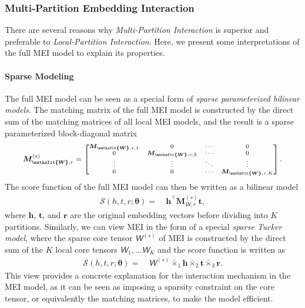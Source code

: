 \documentclass{ecai}
\def\vh{{\bm{h}}}
\def\vr{{\bm{r}}}
\def\vt{{\bm{t}}}
\def\mM{{\bm{M}}}
\newcommand{\tens}[1]{\bm{\mathsfit{#1}}}
\def\tW{{\tens{W}}}
\def\gS{{\mathcal{S}}}
\theoremstyle{plain}  \newtheorem{thm}{Theorem}  \newtheorem{lem}[thm]{Lemma}  \newtheorem{prop}[thm]{Proposition}
\theoremstyle{remark}  \newtheorem*{rem}{Remark}
\begin{document}
\subsubsection{Multi-Partition Embedding Interaction} \label{sect:fullmeitheory}
There are several reasons why \textit{Multi-Partition Interaction} is superior and preferable to \textit{Local-Partition Interaction}. Here, we present some interpretations of the full MEI model to explain its properties.

\paragraph{Sparse Modeling}
The full MEI model can be seen as a special form of \textit{sparse parameterized bilinear models}. The matching matrix of the full MEI model is constructed by the direct sum of the matching matrices of all local MEI models, and the result is a sparse parameterized block-diagonal matrix 
\begin{equation} \label{eq:sparsebilinear}
\small
\begin{split}
\mM^{(s)}_{\tW, r}
= 
\scriptsize
\begin{bmatrix}
\mM_{\tW, r,1} & 0 & \cdots & 0 \\
0 & \mM_{\tW, r,2} & \cdots & 0 \\
\vdots & \vdots & \ddots & \vdots \\
0 & 0& \cdots & \mM_{\tW, r,K}
\end{bmatrix}.
\end{split}
\end{equation}
The score function of the full MEI model can then be written as a bilinear model
\begin{align}
\gS (h,t,r;\bm{\theta}) =\ &\vh^\top \mM^{(s)}_{\tW, r} \vt, \label{eq:scoremeibilinearsparse}
\end{align}
where $ \vh $, $ \vt $, and $ \vr $ are the original embedding vectors before dividing into $ K $ partitions. Similarly, we can view MEI in the form of a special \textit{sparse Tucker model}, where the sparse core tensor $ \tW^{(s)} $ of MEI is constructed by the direct sum of the $ K $ local core tensors $ \tW_1, \dots \tW_K $ and the score function is written as
\begin{align}
\gS (h,t,r;\bm{\theta}) =\ &\tW^{(s)} \bar{\times}_1 \vh \bar{\times}_2 \vt \bar{\times}_3 \vr. \label{eq:scoremeitensorproductsparse}
\end{align}
This view provides a concrete explanation for the interaction mechanism in the MEI model, as it can be seen as imposing a sparsity constraint on the core tensor, or equivalently the matching matrices, to make the model efficient.
\end{document}

